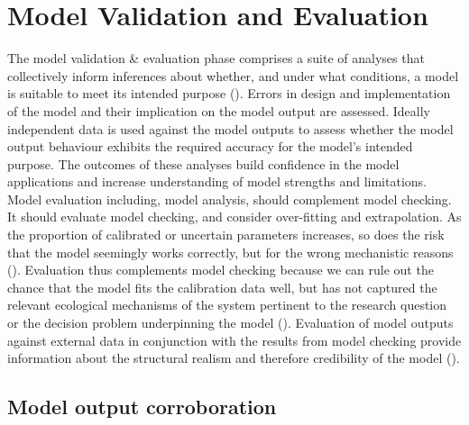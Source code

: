 \documentclass[
]{article}
\begin{document}
\section{Model Validation and
Evaluation}\label{model-validation-and-evaluation}

\begin{tcolorbox}[enhanced jigsaw, rightrule=.15mm, titlerule=0mm, coltitle=black, opacityback=0, bottomrule=.15mm, colback=white, opacitybacktitle=0.6, title=\textcolor{quarto-callout-note-color}{\faInfo}\hspace{0.5em}{Explanation}, toprule=.15mm, colframe=quarto-callout-note-color-frame, left=2mm, leftrule=.75mm, breakable, bottomtitle=1mm, colbacktitle=quarto-callout-note-color!10!white, toptitle=1mm, arc=.35mm]

The model validation \& evaluation phase comprises a suite of analyses
that collectively inform inferences about whether, and under what
conditions, a model is suitable to meet its intended purpose
(). Errors in
design and implementation of the model and their implication on the
model output are assessed. Ideally independent data is used against the
model outputs to assess whether the model output behaviour exhibits the
required accuracy for the model's intended purpose. The outcomes of
these analyses build confidence in the model applications and increase
understanding of model strengths and limitations. Model evaluation
including, model analysis, should complement model checking. It should
evaluate model checking, and consider over-fitting and extrapolation. As
the proportion of calibrated or uncertain parameters increases, so does
the risk that the model seemingly works correctly, but for the wrong
mechanistic reasons ().
Evaluation thus complements model checking because we can rule out the
chance that the model fits the calibration data well, but has not
captured the relevant ecological mechanisms of the system pertinent to
the research question or the decision problem underpinning the model
(). Evaluation of model
outputs against external data in conjunction with the results from model
checking provide information about the structural realism and therefore
credibility of the model ().

\end{tcolorbox}

\subsection{Model output
corroboration}\label{model-output-corroboration}
\end{document}
